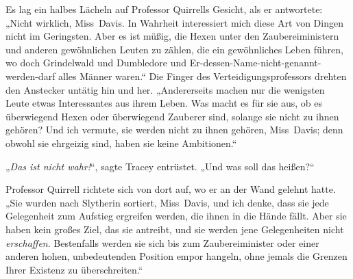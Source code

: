 Es lag ein halbes Lächeln auf Professor Quirrells Gesicht, als er antwortete:
„Nicht wirklich, Miss~Davis. In Wahrheit interessiert mich diese Art von Dingen nicht im Geringsten. Aber es ist müßig, die Hexen unter den Zaubereiministern und anderen gewöhnlichen Leuten zu zählen, die ein gewöhnliches Leben führen, wo doch Grindelwald und Dumbledore und Er-dessen-Name-nicht-genannt-werden-darf alles Männer waren.“ Die Finger des Verteidigungsprofessors drehten den Anstecker untätig hin und her.
„Andererseits machen nur die wenigsten Leute etwas Interessantes aus ihrem Leben. Was macht es für sie aus, ob es überwiegend Hexen oder überwiegend Zauberer sind, solange sie nicht zu ihnen gehören? Und ich vermute, sie werden nicht zu ihnen gehören, Miss~Davis; denn obwohl sie ehrgeizig sind, haben sie keine Ambitionen.“

„\emph{Das ist nicht wahr!}“, sagte Tracey entrüstet.
„Und was soll das heißen?“

Professor Quirrell richtete sich von dort auf, wo er an der Wand gelehnt hatte.
„Sie wurden nach Slytherin sortiert, Miss~Davis, und ich denke, dass sie jede Gelegenheit zum Aufstieg ergreifen werden, die ihnen in die Hände fällt. Aber sie haben kein großes Ziel, das sie antreibt, und sie werden jene Gelegenheiten nicht \emph{erschaffen}. Bestenfalls werden sie sich bis zum Zaubereiminister oder einer anderen hohen, unbedeutenden Position empor hangeln, ohne jemals die Grenzen Ihrer Existenz zu überschreiten.“

